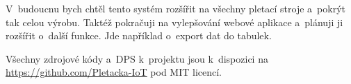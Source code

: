 \documentclass{template/socthesis}
\begin{document}
V~budoucnu bych chtěl tento systém rozšířit na všechny pletací stroje a~pokrýt tak celou výrobu.
Taktéž pokračuji na vylepšování webové aplikace a~plánuji ji rozšířit o~další funkce.
Jde například o~export dat do tabulek.

Všechny zdrojové kódy a~DPS k~projektu jsou k~dispozici na \url{https://github.com/Pletacka-IoT} pod MIT licencí.

\newpage


\printbibliography[title=Literatura]



\appendix
\end{document}
